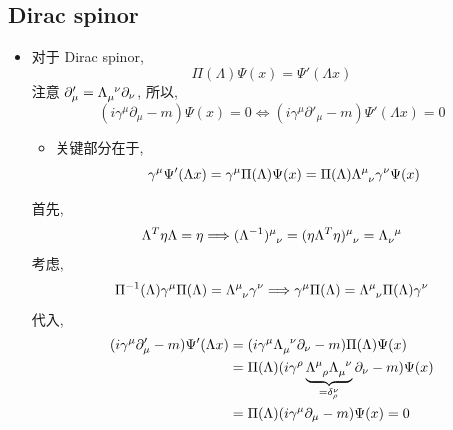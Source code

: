 \subsection{Dirac spinor}
\begin{itemize}
	\item 对于 Dirac spinor,
	\begin{equation}
		\Pi(\Lambda) \Psi(x) = \Psi'(\Lambda x)
	\end{equation}
	注意 $\partial'_\mu = \tensor{\Lambda}{_\mu^\nu} \partial_\nu$, 所以,
	\begin{equation} \label{6.2.10}
		(i \gamma^\mu \partial_\mu - m) \Psi(x) = 0 \iff (i \gamma^\mu \partial'_\mu - m) \Psi'(\Lambda x) = 0
	\end{equation}
	\begin{itemize}
		\item 关键部分在于,
		\begin{equation}
			\gamma^\mu \Psi'(\Lambda x) = \gamma^\mu \Pi(\Lambda) \Psi(x) = \Pi(\Lambda) \tensor{\Lambda}{^\mu_\nu} \gamma^\nu \Psi(x)
		\end{equation}
	\end{itemize}
	
	\begin{tcolorbox}[title=calculation:]
		首先,
		\begin{equation}
			\Lambda^T \eta \Lambda = \eta \Longrightarrow \tensor{(\Lambda^{- 1})}{^\mu_\nu} = \tensor{(\eta \Lambda^T \eta)}{^\mu_\nu} = \tensor{\Lambda}{_\nu^\mu}
		\end{equation}
		考虑,
		\begin{equation}
			\Pi^{- 1}(\Lambda) \gamma^\mu \Pi(\Lambda) = \tensor{\Lambda}{^\mu_\nu} \gamma^\nu \Longrightarrow \gamma^\mu \Pi(\Lambda) = \tensor{\Lambda}{^\mu_\nu} \Pi(\Lambda) \gamma^\nu
		\end{equation}
		代入,
		\begin{align}
			(i \gamma^\mu \partial'_\mu - m) \Psi'(\Lambda x) &= (i \gamma^\mu \tensor{\Lambda}{_\mu^\nu} \partial_\nu - m) \Pi(\Lambda) \Psi(x) \notag \\
			&= \Pi(\Lambda) (i \gamma^\rho \underbrace{\tensor{\Lambda}{^\mu_\rho} \tensor{\Lambda}{_\mu^\nu}}_{= \delta^\nu_\rho} \partial_\nu - m) \Psi(x) \notag \\
			&= \Pi(\Lambda) (i \gamma^\mu \partial_\mu - m) \Psi(x) = 0
		\end{align}
	\end{tcolorbox}
\end{itemize}

